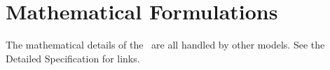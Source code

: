 %
%
% 
%

\section{Mathematical Formulations}
The mathematical details of the \PlanetaryDesc\ are all handled by other models.  See the Detailed Specification for links.